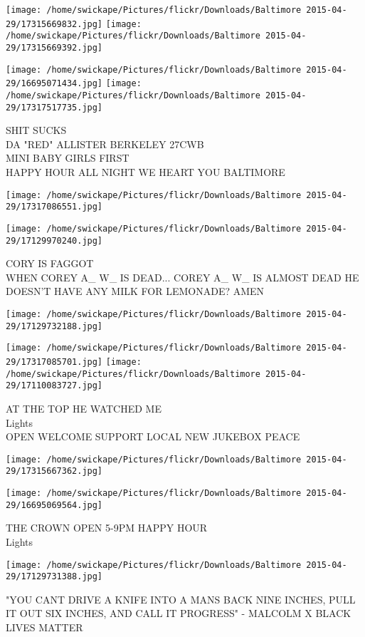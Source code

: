 \documentclass[10pt,letterpaper]{article}
\begin{document}
\texttt{[image: /home/swickape/Pictures/flickr/Downloads/Baltimore 2015-04-29/17315669832.jpg]}
\texttt{[image: /home/swickape/Pictures/flickr/Downloads/Baltimore 2015-04-29/17315669392.jpg]}

\texttt{[image: /home/swickape/Pictures/flickr/Downloads/Baltimore 2015-04-29/16695071434.jpg]}
\texttt{[image: /home/swickape/Pictures/flickr/Downloads/Baltimore 2015-04-29/17317517735.jpg]}

SHIT SUCKS\\
DA "RED" ALLISTER BERKELEY 27CWB\\
MINI BABY GIRLS FIRST\\
HAPPY HOUR ALL NIGHT WE HEART YOU BALTIMORE\\
\pagebreak

\texttt{[image: /home/swickape/Pictures/flickr/Downloads/Baltimore 2015-04-29/17317086551.jpg]}

\vspace{0.25in}
\texttt{[image: /home/swickape/Pictures/flickr/Downloads/Baltimore 2015-04-29/17129970240.jpg]}

CORY IS FAGGOT\\
WHEN COREY A\_ W\_ IS DEAD...  COREY A\_ W\_ IS ALMOST DEAD HE DOESN'T HAVE ANY MILK FOR LEMONADE?  AMEN\\
\pagebreak

\texttt{[image: /home/swickape/Pictures/flickr/Downloads/Baltimore 2015-04-29/17129732188.jpg]}

\vspace{0.25in}
\texttt{[image: /home/swickape/Pictures/flickr/Downloads/Baltimore 2015-04-29/17317085701.jpg]}
\texttt{[image: /home/swickape/Pictures/flickr/Downloads/Baltimore 2015-04-29/17110083727.jpg]}

AT THE TOP HE WATCHED ME\\
Lights\\
OPEN WELCOME SUPPORT LOCAL NEW JUKEBOX PEACE\\
\pagebreak

\texttt{[image: /home/swickape/Pictures/flickr/Downloads/Baltimore 2015-04-29/17315667362.jpg]}

\vspace{0.25in}
\texttt{[image: /home/swickape/Pictures/flickr/Downloads/Baltimore 2015-04-29/16695069564.jpg]}

THE CROWN OPEN 5{-}9PM HAPPY HOUR\\
Lights\\
\pagebreak

\texttt{[image: /home/swickape/Pictures/flickr/Downloads/Baltimore 2015-04-29/17129731388.jpg]}

"YOU CANT DRIVE A KNIFE INTO A MANS BACK NINE INCHES, PULL IT OUT SIX INCHES, AND CALL IT PROGRESS" {-} MALCOLM X BLACK LIVES MATTER\\
\pagebreak
\end{document}
